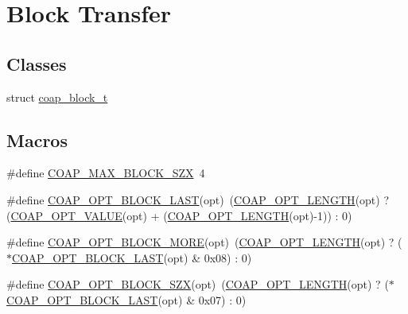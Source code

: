 \hypertarget{group__block}{}\section{Block Transfer}
\label{group__block}
\subsection*{Classes}
\begin{DoxyCompactItemize}
\item 
struct \hyperlink{structcoap__block__t}{coap\+\_\+block\+\_\+t}
\end{DoxyCompactItemize}
\subsection*{Macros}
\begin{DoxyCompactItemize}
\item 
\#define \hyperlink{group__block_ga1a064effcefd02b9e5c8f99b297c0edc}{C\+O\+A\+P\+\_\+\+M\+A\+X\+\_\+\+B\+L\+O\+C\+K\+\_\+\+S\+Z\+X}~4
\item 
\#define \hyperlink{group__block_gad7d63d1ac6f4e326be162f5fb1ee48d9}{C\+O\+A\+P\+\_\+\+O\+P\+T\+\_\+\+B\+L\+O\+C\+K\+\_\+\+L\+A\+S\+T}(opt)~(\hyperlink{group__opt__filter_gad8982f51d2fb676d4b4be50487bb8590}{C\+O\+A\+P\+\_\+\+O\+P\+T\+\_\+\+L\+E\+N\+G\+T\+H}(opt) ? (\hyperlink{group__opt__filter_gac4348d760bb312fdc2f108ee3e8303a4}{C\+O\+A\+P\+\_\+\+O\+P\+T\+\_\+\+V\+A\+L\+U\+E}(opt) + (\hyperlink{group__opt__filter_gad8982f51d2fb676d4b4be50487bb8590}{C\+O\+A\+P\+\_\+\+O\+P\+T\+\_\+\+L\+E\+N\+G\+T\+H}(opt)-\/1)) \+: 0)
\item 
\#define \hyperlink{group__block_ga9e87e4bbd861945d9d1cc672c781662b}{C\+O\+A\+P\+\_\+\+O\+P\+T\+\_\+\+B\+L\+O\+C\+K\+\_\+\+M\+O\+R\+E}(opt)~(\hyperlink{group__opt__filter_gad8982f51d2fb676d4b4be50487bb8590}{C\+O\+A\+P\+\_\+\+O\+P\+T\+\_\+\+L\+E\+N\+G\+T\+H}(opt) ? ($\ast$\hyperlink{group__block_gad7d63d1ac6f4e326be162f5fb1ee48d9}{C\+O\+A\+P\+\_\+\+O\+P\+T\+\_\+\+B\+L\+O\+C\+K\+\_\+\+L\+A\+S\+T}(opt) \& 0x08) \+: 0)
\item 
\#define \hyperlink{group__block_ga3b14a086973dff06815f999b6c873429}{C\+O\+A\+P\+\_\+\+O\+P\+T\+\_\+\+B\+L\+O\+C\+K\+\_\+\+S\+Z\+X}(opt)~(\hyperlink{group__opt__filter_gad8982f51d2fb676d4b4be50487bb8590}{C\+O\+A\+P\+\_\+\+O\+P\+T\+\_\+\+L\+E\+N\+G\+T\+H}(opt) ? ($\ast$\hyperlink{group__block_gad7d63d1ac6f4e326be162f5fb1ee48d9}{C\+O\+A\+P\+\_\+\+O\+P\+T\+\_\+\+B\+L\+O\+C\+K\+\_\+\+L\+A\+S\+T}(opt) \& 0x07) \+: 0)
\end{DoxyCompactItemize}
